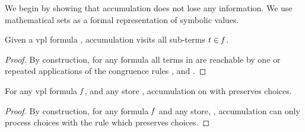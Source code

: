 We begin by showing that accumulation does not lose any information. We use
mathematical sets as a formal representation of symbolic values.

\begin{lemma}
  \label{lemma:acc:all-terms}
  Given a \ac{vpl} formula \fV{}, accumulation visits all sub-terms $\mathit{t}{} \in
  \mathit{f}{}$.
\end{lemma}
%
\begin{proof}
  By construction, for any formula \fV{} all terms in \tV{} are reachable by one
  or repeated applications of the congruence rules \acOrV{}, \acAndV{} and
  \acNotV{}.
\end{proof}

\begin{lemma}
  \label{lemma:acc:preserving:choices}
  For any \ac{vpl} formula $\mathit{f}$, and any store \aStore{}, accumulation on
  \fV{} with \aStore{} preserves choices.
\end{lemma}
%
\begin{proof}
  By construction, for any formula $\mathit{f}$ and any store, \aStore{},
  accumulation can only process choices with the \acChc{} rule which preserves
  choices.
\end{proof}

